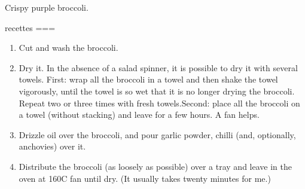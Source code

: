 Crispy purple broccoli.

recettes
===
\begin{enumerate}
\item    Cut and wash the broccoli.
\item    Dry it. In the absence of a salad spinner, it is possible to dry it with several towels. First: wrap all the broccoli in a towel and then shake the towel vigorously, until the towel is so wet that it is no longer drying the broccoli. Repeat two or three times with fresh towels.Second: place all the broccoli on a towel (without stacking) and leave for a few hours. A fan helps.
\item    Drizzle oil over the broccoli, and pour garlic powder, chilli (and, optionally, anchovies) over it.
\item    Distribute the broccoli (as loosely as possible) over a tray and leave in the oven at 160C fan until dry. (It usually takes twenty minutes for me.)
\end{enumerate}